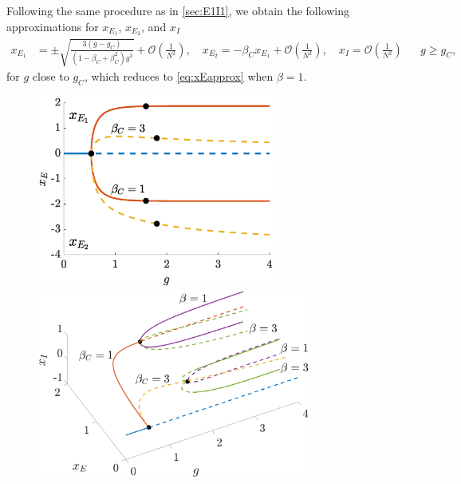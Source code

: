 \documentclass[reqno]{siamonline190516}
\begin{document}
Following the same procedure as in \cref{sec:E1I1}, we obtain the following approximations for $x_{E_1}$, $x_{E_2}$, and $x_I$
\begin{align}\label{eq:XE1}
x_{E_1} &= \pm \sqrt{ \frac{ 3(g - g_C) }{ (1 - \beta_C + \beta_C^2 )g^3}} + \mathcal{O}\left( \frac{1}{N^2}\right), \quad
x_{E_2} = -\beta_C x_{E_1} + \mathcal{O}\left( \frac{1}{N^2} \right), \quad
x_I = \mathcal{O}\left( \frac{1}{N^2} \right)
&& g \geq g_C,
\end{align}
for $g$ close to $g_C$, which reduces to \cref{eq:xEapprox} when $\beta = 1$.

\begin{figure}
    \centering
    \includegraphics[width=7.8cm]{bdclusters20c4E.eps}\hspace{-0.5cm}
    \vspace{-0.5cm}
    \includegraphics[width=9cm]{bdclusters20c4E3D.eps} 

\end{figure}
\end{document}
